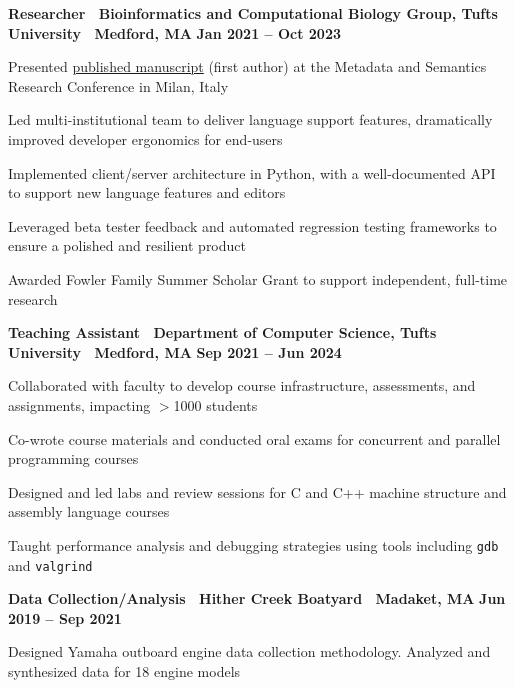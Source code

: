 \documentclass[10pt]{article}
\newenvironment{mylist}[1][]
{\itemize[nosep, wide=0pt, leftmargin=*, after=\strut]}
{\enditemize}
\begin{document}
\begin{minipage}[t]{\linewidth}
    \textbf{Researcher \textbar \ Bioinformatics and Computational Biology Group, Tufts University \textbar \ Medford, MA} \hfill \textbf{Jan 2021 -- Oct 2023}
    \begin{mylist}
    \item Presented \href{https://link.springer.com/chapter/10.1007/978-3-031-65990-4_25}{published manuscript} (first author) at the Metadata and Semantics Research Conference in Milan, Italy
        \item Led multi-institutional team to deliver language support features, dramatically improved developer ergonomics for end-users
        \item Implemented client/server architecture in Python, with a well-documented API to support new language features and editors
        \item Leveraged beta tester feedback and automated regression testing frameworks to ensure a polished and resilient product
        \item Awarded Fowler Family Summer Scholar Grant to support independent, full-time research
    \end{mylist}
\end{minipage}

\begin{minipage}[t]{\linewidth}
    \textbf{Teaching Assistant \textbar \ Department of Computer Science, Tufts University \textbar \ Medford, MA} \hfill \textbf{Sep 2021 -- Jun 2024}
    \begin{mylist} 
        \item Collaborated with faculty to develop course infrastructure, assessments, and assignments, impacting $>$1000 students
        \item Co-wrote course materials and conducted oral exams for concurrent and parallel programming courses
        \item Designed and led labs and review sessions for C and C++ machine structure and assembly language courses
        \item Taught performance analysis and debugging strategies using tools including \texttt{gdb} and \texttt{valgrind}
    \end{mylist}
\end{minipage}

\begin{minipage}[t]{\linewidth}
    \textbf{Data Collection/Analysis \textbar \ Hither Creek Boatyard \textbar \ Madaket, MA} \hfill \textbf{Jun 2019 -- Sep 2021}
    \begin{mylist}
        \item Designed Yamaha outboard engine data collection methodology. Analyzed and synthesized data for 18 engine models
    \end{mylist}
\end{minipage}
\end{document}
